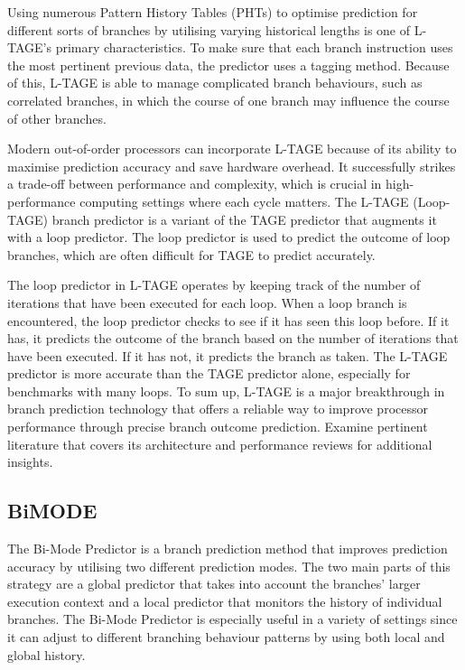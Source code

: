 \documentclass[10pt,journal,compsoc]{IEEEtran}
\begin{document}
Using numerous Pattern History Tables (PHTs) to optimise prediction for different sorts of branches by utilising varying historical lengths is one of L-TAGE's primary characteristics. To make sure that each branch instruction uses the most pertinent previous data, the predictor uses a tagging method. Because of this, L-TAGE is able to manage complicated branch behaviours, such as correlated branches, in which the course of one branch may influence the course of other branches.

Modern out-of-order processors can incorporate L-TAGE because of its ability to maximise prediction accuracy and save hardware overhead. It successfully strikes a trade-off between performance and complexity, which is crucial in high-performance computing settings where each cycle matters.
The L-TAGE (Loop-TAGE) branch predictor is a variant of the TAGE predictor that augments it with a loop predictor. The loop predictor is used to predict the outcome of loop branches, which are often difficult for TAGE to predict accurately.

The loop predictor in L-TAGE operates by keeping track of the number of iterations that have been executed for each loop. When a loop branch is encountered, the loop predictor checks to see if it has seen this loop before. If it has, it predicts the outcome of the branch based on the number of iterations that have been executed. If it has not, it predicts the branch as taken.\cite{seznec64KbytesISLTAGE}
The L-TAGE predictor is more accurate than the TAGE predictor alone, especially for benchmarks with many loops.
To sum up, L-TAGE is a major breakthrough in branch prediction technology that offers a reliable way to improve processor performance through precise branch outcome prediction. Examine pertinent literature that covers its architecture and performance reviews for additional insights.
\subsection{BiMODE}
\noindent The Bi-Mode Predictor is a branch prediction method that improves prediction accuracy by utilising two different prediction modes. The two main parts of this strategy are a global predictor that takes into account the branches' larger execution context and a local predictor that monitors the history of individual branches. The Bi-Mode Predictor is especially useful in a variety of settings since it can adjust to different branching behaviour patterns by using both local and global history.
\end{document}
